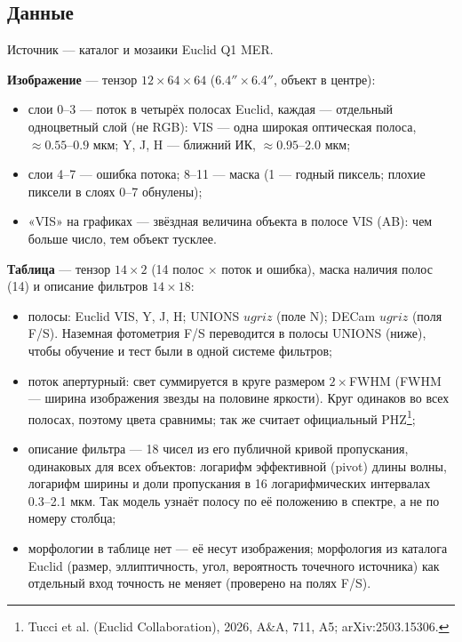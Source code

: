 \documentclass[11pt,a4paper]{article}
\begin{document}
\subsection{Данные}

Источник — каталог и мозаики Euclid Q1 MER.

\textbf{Изображение} — тензор $12\times64\times64$ ($6.4''\times6.4''$, объект в центре):
\begin{itemize}
  \item слои 0–3 — поток в четырёх полосах Euclid, каждая — отдельный одноцветный слой (не RGB): VIS — одна широкая оптическая полоса, $\approx0.55$–$0.9$ мкм; Y, J, H — ближний ИК, $\approx0.95$–$2.0$ мкм;
  \item слои 4–7 — ошибка потока; 8–11 — маска (1 — годный пиксель; плохие пиксели в слоях 0–7 обнулены);
  \item «VIS» на графиках — звёздная величина объекта в полосе VIS (AB): чем больше число, тем объект тусклее.
\end{itemize}

\textbf{Таблица} — тензор $14\times2$ (14 полос $\times$ поток и ошибка), маска наличия полос (14) и описание фильтров $14\times18$:
\begin{itemize}
  \item полосы: Euclid VIS, Y, J, H; UNIONS $ugriz$ (поле N); DECam $ugriz$ (поля F/S). Наземная фотометрия F/S переводится в полосы UNIONS (ниже), чтобы обучение и тест были в одной системе фильтров;
  \item поток апертурный: свет суммируется в круге размером $2\times$FWHM (FWHM — ширина изображения звезды на половине яркости). Круг одинаков во всех полосах, поэтому цвета сравнимы; так же считает официальный PHZ\footnote{\label{fn:tucci}Tucci et al. (Euclid Collaboration), 2026, A\&A, 711, A5; arXiv:2503.15306.};
  \item описание фильтра — 18 чисел из его публичной кривой пропускания, одинаковых для всех объектов: логарифм эффективной (pivot) длины волны, логарифм ширины и доли пропускания в 16 логарифмических интервалах 0.3–2.1 мкм. Так модель узнаёт полосу по её положению в спектре, а не по номеру столбца;
  \item морфологии в таблице нет — её несут изображения; морфология из каталога Euclid (размер, эллиптичность, угол, вероятность точечного источника) как отдельный вход точность не меняет (проверено на полях F/S).
\end{itemize}
\end{document}
